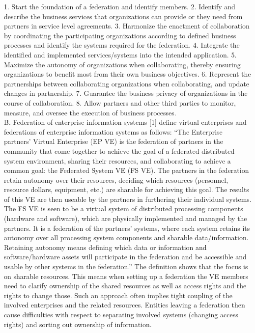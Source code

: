 1.	Start the foundation of a federation and identify members.
2.	Identify and describe the business services that organizations can provide or they need from partners in service level agreements.
3.	Harmonize the enactment of collaboration by coordinating the participating organizations according to defined business processes and identify the systems required for the federation.
4.	Integrate the identified and implemented services/systems into the intended application. 
5.	Maximize the autonomy of organizations when collaborating, thereby ensuring organizations to benefit most from their own business objectives.
6.	Represent the partnerships between collaborating organizations when collaborating, and update changes in partnership.
7.	Guarantee the business privacy of organizations in the course of collaboration.
8.	Allow partners and other third parties to monitor, measure, and oversee the execution of business processes.
\\
B.	Federation of enterprise information systems
[1] define virtual enterprises and federations of enterprise information systems as follows: “The Enterprise partners’ Virtual Enterprise (EP VE) is the federation of partners in the community that come together to achieve the goal of a federated distributed system environment, sharing their resources, and collaborating to achieve a common goal: the Federated System VE (FS VE). The partners in the federation retain autonomy over their resources, deciding which resources (personnel, resource dollars, equipment, etc.) are sharable for achieving this goal. The results of this VE are then useable by the partners in furthering their individual systems. The FS VE is seen to be a virtual system of distributed processing components (hardware and software), which are physically implemented and managed by the partners. It is a federation of the partners’ systems, where each system retains its autonomy over all processing system components and sharable data/information. Retaining autonomy means defining which data or information and software/hardware assets will participate in the federation and be accessible and usable by other systems in the federation.”
The definition shows that the focus is on sharable resources. This means when setting up a federation the VE members need to clarify ownership of the shared resources as well as access rights and the rights to change those. Such an approach often implies tight coupling of the involved enterprises and the related resources. Entities leaving a federation then cause difficulties with respect to separating involved systems (changing access rights) and sorting out ownership of information.

